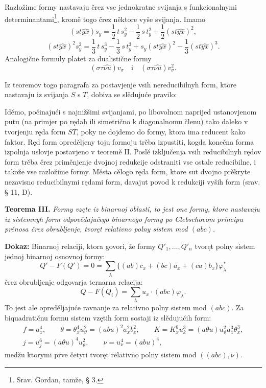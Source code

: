 \documentclass[11pt]{article}
\begin{document}
Razložime formy nastavaju črez vse jednokratne svijanja s funkcionalnymi determinantami\footnote{Srav. Gordan, tamže, § 3.}, kromě togo črez něktore vyše svijanja. Imamo
\[
(st\widehat{yx})s_y=\frac12\,t\,s_y^2-\frac12\,s\,t_y^2+\frac12(st\widehat{yx})^2,
\]
\[
(st\widehat{yx})^2s_y^2=\frac13\,t\,s_y^3-\frac13\,s\,t_y^3+s_y(st\widehat{yx})^2-\frac13(st\widehat{yx})^3.
\]
Analogične formuly platet za dualistične formy
\[
(\sigma\tau\widehat{\nu u})v_\sigma
\quad\text{i}\quad
(\sigma\tau\widehat{\nu u})v_\sigma^2.
\]

Iz teoremov togo paragrafa za postavjenje vsih nereducibilnyh form, ktore nastavaju iz svijanja $S$ s $T$, dobiva se slědujuće pravilo:

Iděmo, počinajući s najnižšimi svijanjami, po libovolnom naprijed ustanovjenom putu (na primjer po rędah ili simetrično k diagonalnomu členu) tako daleko v tvorjenju ręda form $ST$, poky ne dojdemo do formy, ktora ima reducent kako faktor. Ręd form opreděljeny toju formoju trěba izpustiti, kogda konečna forma izpolnja uslovje postavjeno v teoremě II. Poslě izključenja vsih reducibilnyh rędov form trěba črez priměnjenje dvojnoj redukcije odstraniti vse ostale reducibilne, i takože vse razložime formy. Města cělogo ręda form, ktore sut dvojno prěkryte nezavisno reducibilnymi rędami form, davajut povod k redukciji vyših form (srav. § 11, D).

\clearpage
\noindent\textbf{Teorema III.}
{\itshape Formy vzęte iz binarnoj oblasti, to jest one formy, ktore nastavaju iz sistemnyh form odpovědajučego binarnogo formy po Clebschovom principu prěnosa črez obrubljenje, tvoręt relativno polny sistem mod $(abc)$.}

\noindent\textbf{Dokaz:}
Binarnoj relaciji, ktora govori, že formy $Q'_1,\ldots,Q'_n$ tvoręt polny sistem jednoj binarnoj osnovnoj formy:
\[
Q'-F(Q')=0=\sum_\lambda\bigl\{(ab)c_x+(bc)a_x+(ca)b_x\bigr\}\varphi_\lambda^{*}
\]
črez obrubljenje odgovarja ternarna relacija:
\[
Q-F(Q_i)=\sum_\lambda u_x\cdot(abc)\varphi_\lambda .
\]
To jest ale opreděljajuće ravnanje za relativno polny sistem mod $(abc)$. Za biquadratičnu formu sistem vzętih form sostaji iz slědujućih form:
\[
\begin{gathered}
f=a_x^4,\qquad
\theta=\theta_x^4u_\vartheta^2=(abu)^2a_x^2b_x^2,\qquad
K=K_x^6u_k^3=(a\theta u)u_\vartheta^2a_x^3\theta_x^3,\\
j=u_j^6=(a\theta u)^4u_\vartheta^2,\qquad
\nu=u_\nu^4=(abu)^4,
\end{gathered}
\]
medžu ktorymi prve četyri tvoręt relativno polny sistem mod $((abc),\nu)$.
\end{document}
